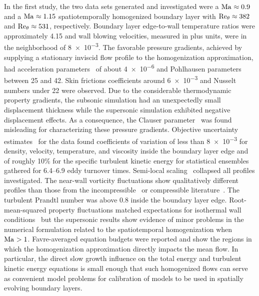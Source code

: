 In the first study, the two data sets generated and investigated were a
$\Mach\approx{}0.9$ and a $\Mach\approx{}1.15$ spatiotemporally homogenized
boundary layer with $\Reynolds[\theta]{}\approx{}382$ and $\Reynolds[\theta]{}\approx{}531$,
respectively.  Boundary layer edge-to-wall temperature ratios were approximately
4.15 and wall blowing velocities, measured in plus units, were in the neighborhood of
\num{8e-3}.  The favorable pressure gradients, achieved by supplying a
stationary inviscid flow profile to the homogenization approximation, had
acceleration parameters~\citep{Launder1964Laminarization} of about \num{4e-6}
and Pohlhausen parameters between 25 and 42.  Skin frictions coefficients around \num{6e-3}
and Nusselt numbers under 22 were observed.  Due to the considerable
thermodynamic property gradients, the subsonic simulation had an unexpectedly
small displacement thickness while the supersonic simulation exhibited negative
displacement effects.  As a consequence, the Clauser
parameter~\citep{Clauser1954Turbulent} was found misleading for characterizing
these pressure gradients.  Objective uncertainty
estimates~\citep{Oliver2014Estimating} for the data found coefficients of
variation of less than \num{8e-3} for density, velocity, temperature, and
viscosity inside the boundary layer edge and of roughly 10\% for the specific
turbulent kinetic energy for statistical ensembles gathered for 6.4--6.9 eddy
turnover times.  Semi-local scaling~\citep{Huang1995Compressible} collapsed all
profiles investigated.  The near-wall vorticity fluctuations show qualitatively
different profiles than those from the incompressible~\citep{Spalart1988Direct} or
compressible literature~\citep{Guarini2000Direct}.  The turbulent Prandtl number
was above 0.8 inside the boundary layer edge.  Root-mean-squared property
fluctuations matched expectations for isothermal wall
conditions~\citep{Coleman1995Numerical} but the supersonic results show evidence
of minor problems in the numerical formulation related to the spatiotemporal
homogenization when $\Mach>1$.  Favre-averaged equation budgets were reported and
show the regions in which the homogenization approximation directly impacts the mean
flow.  In particular, the direct slow growth influence on the total energy and
turbulent kinetic energy equations is small enough that
such homogenized flows can serve as convenient model problems for calibration
of models to be used in spatially evolving boundary layers.


